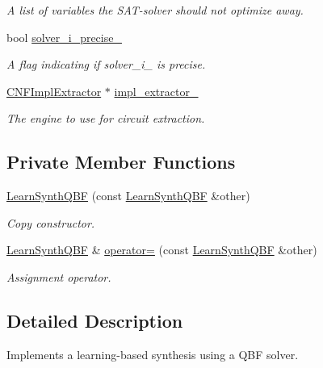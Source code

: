 \begin{DoxyCompactItemize}
\begin{DoxyCompactList}\small\item\em A list of variables the S\-A\-T-\/solver should not optimize away. \end{DoxyCompactList}\item 
bool \hyperlink{classLearnSynthQBF_ae65774a2b9e6137d6ff45cbf755d4843}{solver\-\_\-i\-\_\-precise\-\_\-}
\begin{DoxyCompactList}\small\item\em A flag indicating if solver\-\_\-i\-\_\- is precise. \end{DoxyCompactList}\item 
\hyperlink{classCNFImplExtractor}{C\-N\-F\-Impl\-Extractor} $\ast$ \hyperlink{classLearnSynthQBF_ad34b0c8db41c054eef617e7e9156fad8}{impl\-\_\-extractor\-\_\-}
\begin{DoxyCompactList}\small\item\em The engine to use for circuit extraction. \end{DoxyCompactList}\end{DoxyCompactItemize}
\subsection*{Private Member Functions}
\begin{DoxyCompactItemize}
\item 
\hyperlink{classLearnSynthQBF_ad8d67501811be3fc0366e19df7f8d10a}{Learn\-Synth\-Q\-B\-F} (const \hyperlink{classLearnSynthQBF}{Learn\-Synth\-Q\-B\-F} \&other)
\begin{DoxyCompactList}\small\item\em Copy constructor. \end{DoxyCompactList}\item 
\hyperlink{classLearnSynthQBF}{Learn\-Synth\-Q\-B\-F} \& \hyperlink{classLearnSynthQBF_a143bc7b32f7511ddbdbdec01c2e43578}{operator=} (const \hyperlink{classLearnSynthQBF}{Learn\-Synth\-Q\-B\-F} \&other)
\begin{DoxyCompactList}\small\item\em Assignment operator. \end{DoxyCompactList}\end{DoxyCompactItemize}


\subsection{Detailed Description}
Implements a learning-\/based synthesis using a Q\-B\-F solver. 

